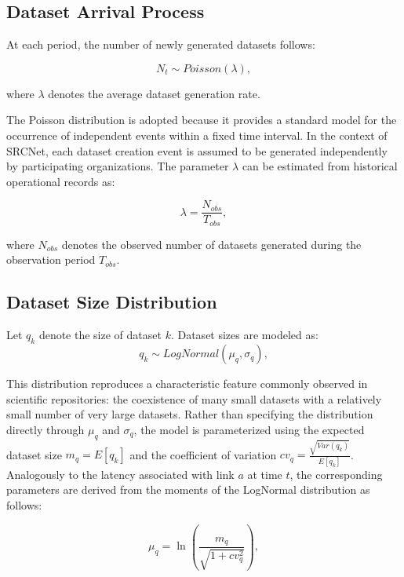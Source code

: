 \documentclass[a4paper,fleqn]{cas-dc}
\begin{document}
\subsection*{Dataset Arrival Process}

At each period, the number of newly generated datasets follows:

\begin{equation} 
N_t \sim Poisson(\lambda), 
\end{equation} 


where \(\lambda\) denotes the average dataset generation rate. 

The Poisson distribution is adopted because it provides a standard model for the occurrence of independent events within a fixed time interval. In the context of SRCNet, each dataset creation event is assumed to be generated independently by participating organizations. The parameter \(\lambda\) can be estimated from historical operational records as:

\begin{equation} 
\lambda = \frac{N_{obs}} {T_{obs}}, 
\end{equation} 

where \(N_{obs}\) denotes the observed number of datasets generated during the observation period \(T_{obs}\).

\subsection*{Dataset Size Distribution}

Let \(q_k\) denote the size of dataset \(k\). Dataset sizes are modeled as: 
\begin{equation} 
q_k \sim LogNormal(\mu_q,\sigma_q), 
\end{equation} 

This distribution reproduces a characteristic feature commonly observed in scientific repositories: the coexistence of many small datasets with a relatively small number of very large datasets. Rather than specifying the distribution directly through \(\mu_q\) and \(\sigma_q\), the model is parameterized using the expected dataset size $m_q=E[q_k]$ and the coefficient of variation $cv_q= \frac{\sqrt{Var(q_k)}} {E[q_k]}$. Analogously to the latency associated with link $a$ at time $t$, the corresponding parameters are derived from the moments of the LogNormal distribution as follows:

\begin{equation} 
\mu_q = \ln \left( \frac{m_q} {\sqrt{1+cv_q^2}} \right), 
\end{equation} 
\end{document}
